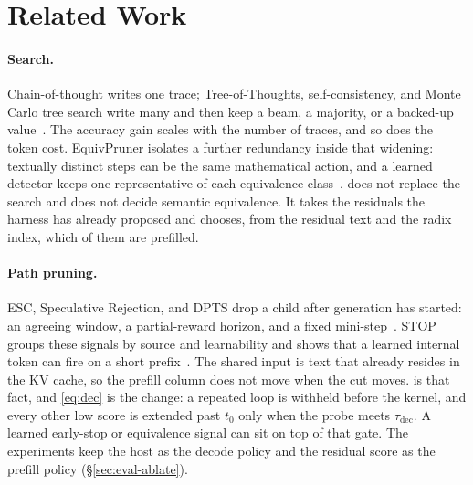 \section{Related Work}
\label{sec:related}

\paragraph{Search.}
Chain-of-thought writes one trace; Tree-of-Thoughts, self-consistency, and Monte Carlo tree search write many and then keep a beam, a majority, or a backed-up value~\cite{cot,tot,selfconsistency,mctsllm}.
The accuracy gain scales with the number of traces, and so does the token cost.
EquivPruner isolates a further redundancy inside that widening: textually distinct steps can be the same mathematical action, and a learned detector keeps one representative of each equivalence class~\cite{equivpruner}.
\sys does not replace the search and does not decide semantic equivalence.
It takes the residuals the harness has already proposed and chooses, from the residual text and the radix index, which of them are prefilled.

\paragraph{Path pruning.}
ESC, Speculative Rejection, and DPTS drop a child after generation has started: an agreeing window, a partial-reward horizon, and a fixed mini-step~\cite{esc,specrej,dpts}.
STOP groups these signals by source and learnability and shows that a learned internal token can fire on a short prefix~\cite{stoploss}.
The shared input is text that already resides in the KV cache, so the prefill column does not move when the cut moves.
 is that fact, and \eqref{eq:dec} is the change: a repeated loop is withheld before the kernel, and every other low score is extended past $t_0$ only when the probe meets $\tau_{\mathrm{dec}}$.
A learned early-stop or equivalence signal can sit on top of that gate.
The experiments keep the host as the decode policy and the residual score as the prefill policy (\S\ref{sec:eval-ablate}).

